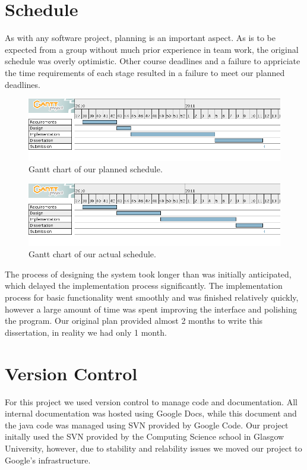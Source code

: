 \label{Organisation}

\section{Schedule}

As with any software project, planning is an important aspect. As is to be expected from a group without much prior experience in team work, the original schedule was overly optimistic. Other course deadlines and a failure to appriciate the time requirements of each stage resulted in a failure to meet our planned deadlines. 

\begin{figure}[!h]
    \begin{center}
        \includegraphics[width=14cm]{appendix/Diagrams/GIMplan.png}
        \caption{Gantt chart of our planned schedule.}
        \label{lockingDia}
    \end{center}
\end{figure}

\begin{figure}[!h]
    \begin{center}
        \includegraphics[width=14cm]{appendix/Diagrams/GIMreal.png}
        \caption{Gantt chart of our actual schedule.}
        \label{lockingDia}
    \end{center}
\end{figure}

The process of designing the system took longer than was initially anticipated, which delayed the implementation process significantly. The implementation process for basic functionality went smoothly and was finished relatively quickly, however a large amount of time was spent improving the interface and polishing the program. Our original plan provided almost 2 months to write this dissertation, in reality we had only 1 month.  

\section{Version Control}

For this project we used version control to manage code and documentation. All internal documentation was hosted using Google Docs, while this document and the java code was managed using SVN provided by Google Code. Our project initally used the SVN provided by the Computing Science school in Glasgow University, however, due to stability and relability issues we moved our project to Google's infrastructure.
